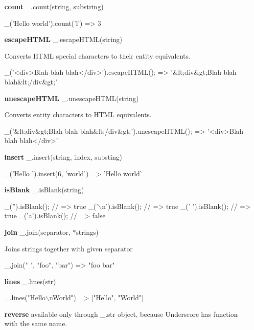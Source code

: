{\bfseries count} \+\_\+.\+count(string, substring)


\begin{DoxyCode}
\_('Hello world').count('l')
=> 3
\end{DoxyCode}


{\bfseries escape\+H\+T\+ML} \+\_\+.\+escape\+H\+T\+M\+L(string)

Converts H\+T\+ML special characters to their entity equivalents.


\begin{DoxyCode}
\_('<div>Blah blah blah</div>').escapeHTML();
=> '&lt;div&gt;Blah blah blah&lt;/div&gt;'
\end{DoxyCode}


{\bfseries unescape\+H\+T\+ML} \+\_\+.\+unescape\+H\+T\+M\+L(string)

Converts entity characters to H\+T\+ML equivalents.


\begin{DoxyCode}
\_('&lt;div&gt;Blah blah blah&lt;/div&gt;').unescapeHTML();
=> '<div>Blah blah blah</div>'
\end{DoxyCode}


{\bfseries insert} \+\_\+.\+insert(string, index, substing)


\begin{DoxyCode}
\_('Hello ').insert(6, 'world')
=> 'Hello world'
\end{DoxyCode}


{\bfseries is\+Blank} \+\_\+.\+is\+Blank(string)


\begin{DoxyCode}
\_('').isBlank(); // => true
\_('\(\backslash\)n').isBlank(); // => true
\_(' ').isBlank(); // => true
\_('a').isBlank(); // => false
\end{DoxyCode}


{\bfseries join} \+\_\+.\+join(separator, $\ast$strings)

Joins strings together with given separator


\begin{DoxyCode}
\_.join(" ", "foo", "bar")
=> "foo bar"
\end{DoxyCode}


{\bfseries lines} \+\_\+.\+lines(str)


\begin{DoxyCode}
\_.lines("Hello\(\backslash\)nWorld")
=> ["Hello", "World"]
\end{DoxyCode}


{\bfseries reverse} available only through \+\_\+.\+str object, because Underscore has function with the same name.

